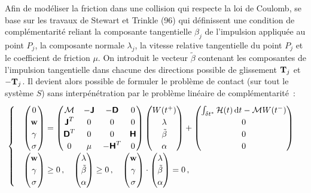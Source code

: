 Afin de modéliser la friction dans une collision qui respecte la loi de Coulomb, \parencite{rabatel2015thesis} se base sur les travaux de Stewart et Trinkle (96) qui définissent une condition de complémentarité reliant la composante tangentielle $\beta_j$ de l'impulsion appliquée au point $P_j$, la composante normale $\lambda_j$, la vitesse relative tangentielle du point $P_j$ et le coefficient de friction $\mu$. On introduit le vecteur $\tilde{\beta}$ contenant les composantes de l'impulsion tangentielle dans chacune des directions possible de glissement $\bm{\mathrm{T}}_j$ et $-\bm{\mathrm{T}}_j$. Il devient alors possible de formuler le problème de contact (sur tout le système $S$) sans interpénétration par le problème linéaire de complémentarité :
\begin{align} \label{eq:bilan3}
\begin{cases} \quad
    \begin{pmatrix}
        0 \\ \bvec{w} \\ \gamma \\ \sigma 
    \end{pmatrix} =  
    \begin{pmatrix}
        \mathcal{M} &  -\bmat{J} & -\bmat{D} & 0 \\
        \bmat{J}^T & 0 & 0 & 0 \\
        \bmat{D}^T & 0 & 0 & \bmat{H} \\
        0 & \mu & -\bmat{H}^T & 0
    \end{pmatrix} 
    \begin{pmatrix}
        W(t^+) \\ \lambda \\ \tilde{\beta} \\ \alpha
    \end{pmatrix} + 
    \begin{pmatrix}
        \int_{\delta t^*} \mathcal{H}(t) \diff t - \mathcal{M} W(t^{-}) \\ 0 \\ 0 \\ 0
    \end{pmatrix} \\ \quad
    \begin{pmatrix}
        \bvec{w} \\ \gamma \\ \sigma
    \end{pmatrix} \geq 0 \,, \quad
    \begin{pmatrix}
        \lambda \\ \tilde{\beta} \\ \alpha
    \end{pmatrix} \geq 0 \,, \quad
    \begin{pmatrix}
        \bvec{w} \\ \gamma \\ \sigma
    \end{pmatrix} \cdot
    \begin{pmatrix}
        \lambda \\ \tilde{\beta} \\ \alpha
    \end{pmatrix}  
     = 0 \,,
\end{cases}
\end{align}

